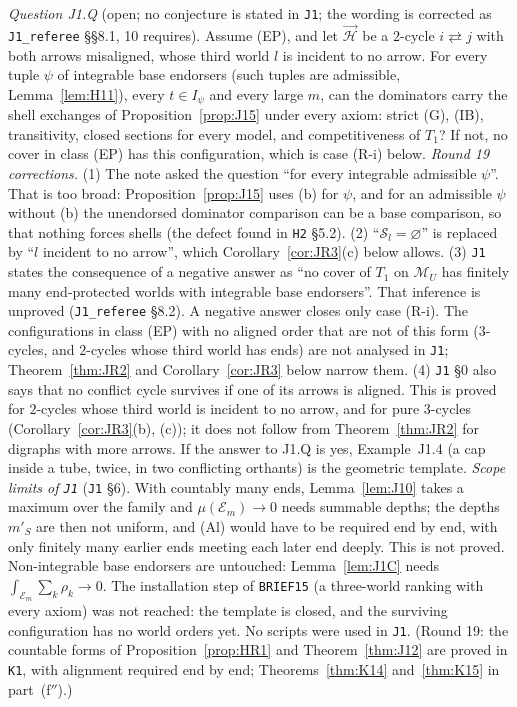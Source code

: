 \documentclass[11pt]{article}
\theoremstyle{definition}
\theoremstyle{remark}
\newcommand{\M}{\mathcal M}
\newcommand{\src}[1]{\texttt{#1}}
\begin{document}
\emph{Question J1.Q} (open; no conjecture is stated in \src{J1}; the wording is corrected as \src{J1\_referee} \S\S8.1, 10 requires). Assume (EP), and let $\vec{\mathcal H}$ be a $2$-cycle $i\rightleftarrows j$ with both arrows misaligned, whose third world $l$ is incident to no arrow. For every tuple $\psi$ of integrable base endorsers (such tuples are admissible, Lemma~\ref{lem:H11}), every $t\in I_\psi$ and every large $m$, can the dominators carry the shell exchanges of Proposition~\ref{prop:J15} under every axiom: strict (G), (IB), transitivity, closed sections for every model, and competitiveness of $T_1$? If not, no cover in class (EP) has this configuration, which is case (R-i) below. \emph{Round 19 corrections.} (1) The note asked the question ``for every integrable admissible $\psi$''. That is too broad: Proposition~\ref{prop:J15} uses (b) for $\psi$, and for an admissible $\psi$ without (b) the unendorsed dominator comparison can be a base comparison, so that nothing forces shells (the defect found in \src{H2} \S5.2). (2) ``$\mathcal S_l=\varnothing$'' is replaced by ``$l$ incident to no arrow'', which Corollary~\ref{cor:JR3}(c) below allows. (3) \src{J1} states the consequence of a negative answer as ``no cover of $T_1$ on $\M_U$ has finitely many end-protected worlds with integrable base endorsers''. That inference is unproved (\src{J1\_referee} \S8.2). A negative answer closes only case (R-i). The configurations in class (EP) with no aligned order that are not of this form ($3$-cycles, and $2$-cycles whose third world has ends) are not analysed in \src{J1}; Theorem~\ref{thm:JR2} and Corollary~\ref{cor:JR3} below narrow them. (4) \src{J1} \S0 also says that no conflict cycle survives if one of its arrows is aligned. This is proved for $2$-cycles whose third world is incident to no arrow, and for pure $3$-cycles (Corollary~\ref{cor:JR3}(b), (c)); it does not follow from Theorem~\ref{thm:JR2} for digraphs with more arrows. If the answer to J1.Q is yes, Example~J1.4 (a cap inside a tube, twice, in two conflicting orthants) is the geometric template. \emph{Scope limits of \src{J1}} (\src{J1} \S6). With countably many ends, Lemma~\ref{lem:J10} takes a maximum over the family and $\mu(\mathcal E_m)\to0$ needs summable depths; the depths $m'_S$ are then not uniform, and (Al) would have to be required end by end, with only finitely many earlier ends meeting each later end deeply. This is not proved. Non-integrable base endorsers are untouched: Lemma~\ref{lem:J1C} needs $\int_{\mathcal E_m}\sum_k\rho_k\to0$. The installation step of \src{BRIEF15} (a three-world ranking with every axiom) was not reached: the template is closed, and the surviving configuration has no world orders yet. No scripts were used in \src{J1}. (Round 19: the countable forms of Proposition~\ref{prop:HR1} and Theorem~\ref{thm:J12} are proved in \src{K1}, with alignment required end by end; Theorems~\ref{thm:K14} and~\ref{thm:K15} in part~(f$''$).)
\end{document}
